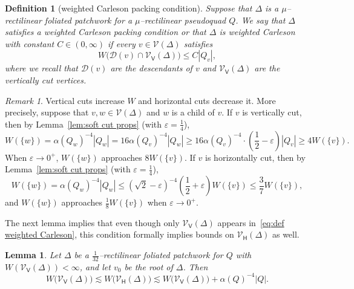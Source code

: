 \documentclass[11pt,reqno]{amsart}
\newcommand{\cD}{\mathcal{D}}
\newcommand{\cV}{\mathcal{V}}
\renewcommand{\epsilon}{\varepsilon}
\newcommand{\e}{\varepsilon}
\newcommand{\0}{\mathbf{0}}
\renewcommand{\1}{\mathbf 1}
\renewcommand{\ge}{\geqslant}
\renewcommand{\le}{\leqslant}
\newtheorem{lemma}[thm]{Lemma}
\newtheorem{defn}[thm]{Definition}
\theoremstyle{remark}
\newtheorem{remark}[thm]{Remark}
\newcommand{\cVv}{{\mathcal{V}_{\mathsf{V}}}}
\newcommand{\cVh}{{\mathcal{V}_{\mathsf{H}}}}
\begin{document}
\begin{defn}[weighted Carleson packing condition]\label{def:weighted Carleson} Suppose that $\Delta$ is a $\mu$--rectilinear foliated patchwork for a $\mu$--rectilinear pseudoquad $Q$. We say that \(\Delta\) satisfies a \emph{weighted Carleson packing condition} or that \(\Delta\) is \emph{weighted Carleson} with constant \(C\in (0,\infty)\) if every \(v\in \cV(\Delta)\) satisfies
  \begin{equation}\label{eq:def weighted Carleson}
    W\big(\cD(v)\cap \cVv(\Delta)\big) \le C |Q_v|,
  \end{equation}
  where we recall that $\cD(v)$ are the descendants of $v$ and $\cVv(\Delta)$ are the vertically cut vertices.
\end{defn}

\begin{remark}
  Vertical cuts increase $W$ and horizontal cuts decrease it.  More precisely, suppose that $v, w\in \cV(\Delta)$ and $w$ is a child of $v$.  If $v$ is vertically cut, then by Lemma~\ref{lem:soft cut props} (with $\e=\frac{1}{4}$),
  \begin{equation}\label{eq:vertical cut weight}
    W(\{w\})=\alpha(Q_w)^{-4} |Q_w|=16 \alpha(Q_v)^{-4} |Q_w| \ge 16 \alpha(Q_v)^{-4} \cdot \left(\frac{1}{2}-\epsilon\right) |Q_v| \ge 4 W(\{v\}).
  \end{equation}
  When $\epsilon\to 0^+$, $W(\{w\})$ approaches $8 W(\{v\})$.
  If $v$ is horizontally cut, then by Lemma~\ref{lem:soft cut props} (with $\e=\frac{1}{4}$),
  \begin{equation}\label{eq:horizontal cut weight}
    W(\{w\})=\alpha(Q_w)^{-4} |Q_w| \le (\sqrt{2}-\epsilon)^{-4} \left(\frac{1}{2}+\epsilon\right) W(\{v\}) \le \frac{3}{7} W(\{v\}),
  \end{equation}
  and $W(\{w\})$ approaches $\frac{1}{8} W(\{v\})$ when $\epsilon\to 0^+$.
\end{remark}

The next lemma implies that even though only $\cVv(\Delta)$ appears in~\eqref{eq:def weighted Carleson}, this condition formally implies bounds on $\cVh(\Delta)$ as well.

\begin{lemma}\label{lem:vertex sums}
  Let $\Delta$ be a  \(\frac{1}{32}\)--rectilinear foliated patchwork for  $Q$  with $W(\cVv(\Delta))<\infty$, and let $v_0$ be the root of $\Delta$.  Then
  $$W\big(\cVv(\Delta)\big) \lesssim W\big(\cVh(\Delta)\big)\lesssim W\big(\cVv(\Delta)\big)+\alpha(Q)^{-4}|Q|.$$
\end{lemma}
\end{document}
